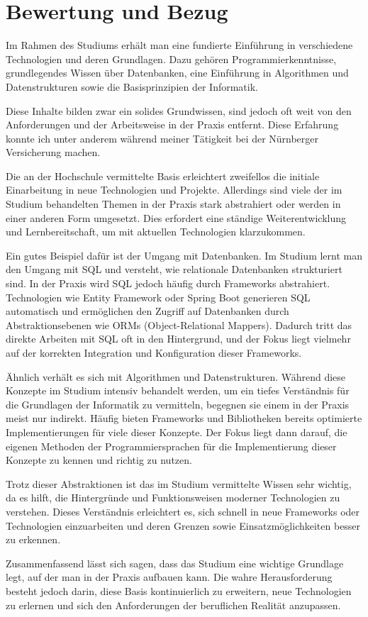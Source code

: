 \chapter{Bewertung und Bezug}
Im Rahmen des Studiums erhält man eine fundierte Einführung in verschiedene Technologien und deren Grundlagen. 
Dazu gehören Programmierkenntnisse, grundlegendes Wissen über Datenbanken, eine Einführung in 
Algorithmen und Datenstrukturen sowie die Basisprinzipien der Informatik.

Diese Inhalte bilden zwar ein solides Grundwissen, sind jedoch oft weit von den Anforderungen und der Arbeitsweise in der Praxis entfernt.
Diese Erfahrung konnte ich unter anderem während meiner Tätigkeit bei der Nürnberger Versicherung machen.

Die an der Hochschule vermittelte Basis erleichtert zweifellos die initiale Einarbeitung in neue Technologien und Projekte. 
Allerdings sind viele der im Studium behandelten Themen in der Praxis stark abstrahiert oder werden in einer anderen Form umgesetzt. 
Dies erfordert eine ständige Weiterentwicklung und Lernbereitschaft, um mit aktuellen Technologien klarzukommen.

Ein gutes Beispiel dafür ist der Umgang mit Datenbanken. Im Studium lernt man den Umgang mit SQL und versteht, wie relationale Datenbanken 
strukturiert sind. In der Praxis wird SQL jedoch häufig durch Frameworks abstrahiert. 
Technologien wie Entity Framework oder Spring Boot generieren SQL automatisch und ermöglichen den Zugriff auf Datenbanken durch 
Abstraktionsebenen wie ORMs (Object-Relational Mappers). Dadurch tritt das direkte Arbeiten mit SQL oft in den Hintergrund, und der Fokus liegt 
vielmehr auf der korrekten Integration und Konfiguration dieser Frameworks.

Ähnlich verhält es sich mit Algorithmen und Datenstrukturen. Während diese Konzepte im Studium intensiv behandelt werden, 
um ein tiefes Verständnis für die Grundlagen der Informatik zu vermitteln, begegnen sie einem in der Praxis meist nur indirekt. 
Häufig bieten Frameworks und Bibliotheken bereits optimierte Implementierungen für viele dieser Konzepte. Der Fokus liegt dann darauf, die eigenen Methoden der Programmiersprachen für
die Implementierung dieser Konzepte zu kennen und richtig zu nutzen.

Trotz dieser Abstraktionen ist das im Studium vermittelte Wissen sehr wichtig, da es hilft, 
die Hintergründe und Funktionsweisen moderner Technologien zu verstehen. Dieses Verständnis erleichtert es, 
sich schnell in neue Frameworks oder Technologien einzuarbeiten und deren Grenzen sowie Einsatzmöglichkeiten besser zu erkennen.

Zusammenfassend lässt sich sagen, dass das Studium eine wichtige Grundlage legt, auf der man in der Praxis aufbauen kann. 
Die wahre Herausforderung besteht jedoch darin, diese Basis kontinuierlich zu erweitern, neue Technologien zu erlernen 
und sich den Anforderungen der beruflichen Realität anzupassen.

